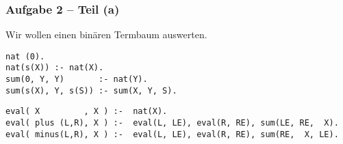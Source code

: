 \documentclass{beamer}
\begin{document}
\begin{frame}[fragile] \frametitle{Aufgabe 2 -- Teil (a)}
	\footnotesize
	
	Wir wollen einen binären Termbaum auswerten. 
	\begin{lstlisting}[basicstyle=\ttfamily\tiny]
nat (0).
nat(s(X)) :- nat(X).
sum(0, Y, Y)       :- nat(Y).
sum(s(X), Y, s(S)) :- sum(X, Y, S).
	\end{lstlisting}
	
	\pause
	
	\begin{lstlisting}[firstnumber=5, basicstyle=\ttfamily\tiny]
eval( X         , X ) :-  nat(X). 
eval( plus (L,R), X ) :-  eval(L, LE), eval(R, RE), sum(LE, RE,  X). 
eval( minus(L,R), X ) :-  eval(L, LE), eval(R, RE), sum(RE,  X, LE).
	\end{lstlisting}
\end{frame}
\end{document}
